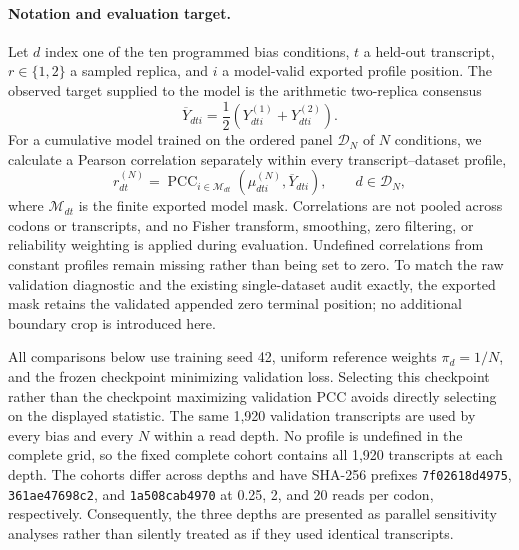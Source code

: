 \paragraph{Notation and evaluation target.}
Let $d$ index one of the ten programmed bias conditions, $t$ a held-out
transcript, $r\in\{1,2\}$ a sampled replica, and $i$ a model-valid exported
profile position.  The observed target supplied to the model is the arithmetic
two-replica consensus
\begin{equation}
    \overline{Y}_{dti}=\frac{1}{2}
       \left(Y^{(1)}_{dti}+Y^{(2)}_{dti}\right).
    \label{eq:appendix_replica_consensus}
\end{equation}
For a cumulative model trained on the ordered panel $\mathcal D_N$ of $N$
conditions, we calculate a Pearson correlation separately within every
transcript--dataset profile,
\begin{equation}
    r^{(N)}_{dt}
      =\operatorname{PCC}_{i\in\mathcal M_{dt}}
         \!\left(\mu^{(N)}_{dti},\overline{Y}_{dti}\right),
    \qquad d\in\mathcal D_N,
    \label{eq:appendix_mu_observation_pcc}
\end{equation}
where $\mathcal M_{dt}$ is the finite exported model mask.  Correlations are
not pooled across codons or transcripts, and no Fisher transform, smoothing,
zero filtering, or reliability weighting is applied during evaluation.
Undefined correlations from constant profiles remain missing rather than
being set to zero.  To match the raw validation diagnostic and the existing
single-dataset audit exactly, the exported mask retains the validated appended
zero terminal position; no additional boundary crop is introduced here.

All comparisons below use training seed 42, uniform reference weights
$\pi_d=1/N$, and the frozen checkpoint minimizing validation loss.  Selecting
this checkpoint rather than the checkpoint maximizing validation PCC avoids
directly selecting on the displayed statistic.  The same 1,920 validation
transcripts are used by every bias and every $N$ within a read depth.  No
profile is undefined in the complete grid, so the fixed complete cohort
contains all 1,920 transcripts at each depth.  The cohorts differ across
depths and have SHA-256 prefixes \texttt{7f02618d4975},
\texttt{361ae47698c2}, and \texttt{1a508cab4970} at 0.25, 2, and 20 reads per
codon, respectively.  Consequently, the three depths are presented as
parallel sensitivity analyses rather than silently treated as if they used
identical transcripts.

